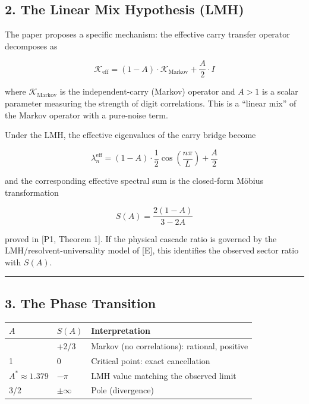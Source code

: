 \documentclass[
  11pt,
]{article}
\begin{document}
\subsection{2. The Linear Mix Hypothesis
(LMH)}\label{the-linear-mix-hypothesis-lmh}

The paper proposes a specific mechanism: the effective carry transfer operator
decomposes as

\[\mathcal{K}_{\mathrm{eff}} = (1-A) \cdot \mathcal{K}_{\mathrm{Markov}} + \frac{A}{2} \cdot I\]

where \(\mathcal{K}_{\mathrm{Markov}}\) is the independent-carry (Markov)
operator and \(A > 1\) is a scalar parameter measuring the strength of digit
correlations. This is a ``linear mix'' of the Markov operator with a pure-noise
term.

Under the LMH, the effective eigenvalues of the carry bridge become

\[\lambda_n^{\mathrm{eff}} = (1 - A) \cdot \frac{1}{2}\cos\!\left(\frac{n\pi}{L}\right) + \frac{A}{2}\]

and the corresponding effective spectral sum is the closed-form Möbius
transformation

\[S(A) = \frac{2(1-A)}{3-2A}\]

proved in {[}P1, Theorem 1{]}. If the physical cascade ratio is governed by the
LMH/resolvent-universality model of {[}E{]}, this identifies the observed sector
ratio with \(S(A)\).

\begin{center}\rule{0.5\linewidth}{0.5pt}\end{center}

\newpage

\subsection{3. The Phase Transition}\label{the-phase-transition}

\begin{longtable}[]{@{}lll@{}}
\toprule\noalign{}
\(A\) & \(S(A)\) & Interpretation \\
\midrule\noalign{}
\endhead
\bottomrule\noalign{}
\endlastfoot
0 & +2/3 & Markov (no correlations): rational, positive \\
1 & 0 & Critical point: exact cancellation \\
\(A^* \approx 1.379\) & \(-\pi\) & LMH value matching the observed limit \\
3/2 & \(\pm\infty\) & Pole (divergence) \\
\end{longtable}
\end{document}

